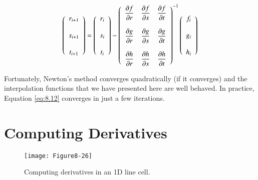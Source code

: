 \begin{equation}\label{eq:8.12}
\left(
\begin{array}{c}
r_{i + 1} \\ \\
s_{i + 1} \\ \\
t_{i + 1}
\end{array}
\right) = \left(
\begin{array}{c}
r_i \\ \\
s_i \\ \\
t_i
\end{array}
\right) - \left(
\begin{array}{c c c}
\dfrac{\partial f}{\partial r} & \dfrac{\partial f}{\partial s} & \dfrac{\partial f}{\partial t} \\ \\
\dfrac{\partial g}{\partial r} & \dfrac{\partial g}{\partial s} & \dfrac{\partial g}{\partial t} \\ \\
\dfrac{\partial h}{\partial r} & \dfrac{\partial h}{\partial s} & \dfrac{\partial h}{\partial t}
\end{array}
\right)^{-1}
\left(
\begin{array}{c}
f_i \\ \\
g_i \\ \\
h_i
\end{array}
\right)
\end{equation}

Fortunately, Newton’s method converges quadratically (if it converges) and the interpolation functions that we have presented here are well behaved. In practice, Equation \ref{eq:8.12} converges in just a few iterations.

\section{Computing Derivatives}

\begin{figure}[!htb]
    \centering
    \texttt{[image: Figure8-26]}\\
    \caption{Computing derivatives in an 1D line cell.}\label{fig:Figure8-26}
\end{figure}

